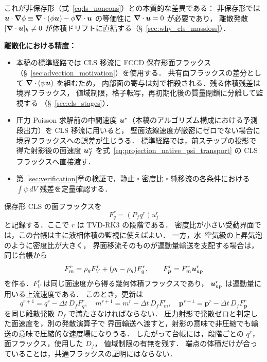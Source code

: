 これが非保存形（式~\eqref{eq:ls_noncons}）との本質的な差異である：
非保存形では $\bm{u}\cdot\bm{\nabla}\phi \equiv \bm{\nabla}\cdot(\phi\bm{u}) - \phi\bm{\nabla}\cdot\bm{u}$
の等価性に $\bm{\nabla}\cdot\bm{u}=0$ が必要であり，
離散発散 $[\bm{\nabla}\cdot\bm{u}]_h\neq 0$ が体積ドリフトに直結する（§~\ref{sec:why_cls_massloss}）．

\textbf{離散化における精度：}
\begin{itemize}
  \item 本稿の標準経路では CLS 移流に FCCD 保存形面フラックス
        （§~\ref{sec:advection_motivation}）を使用する．
        共有面フラックスの差分として $\bm{\nabla}\cdot(\psi\bm{u})$ を組むため，
        内部面の寄与は対で相殺される．残る体積残差は境界フラックス，
        値域制限，格子転写，再初期化後の質量閉鎖に分離して監視する
        （§~\ref{sec:cls_stages}）．
  \item 圧力 Poisson 求解前の中間速度 $\bm{u}^*$（本稿のアルゴリズム構成における予測段出力）を CLS 移流に用いると，
        壁面法線速度が厳密にゼロでない場合に境界フラックスへの誤差が生じうる．
        標準経路では，前ステップの投影で得た射影後の面速度 $\bm{u}_f^n$
        を式~\eqref{eq:projection_native_psi_transport} の CLS フラックスへ直接渡す．
  \item 第~\ref{sec:verification}章の検証で，静止・密度比・純移流の各条件における
        $\int\psi\,dV$ 残差を定量確認する．
\end{itemize}

\begin{tcolorbox}[defbox, title={共通フラックス台帳：界面だけを保存しても足りない場合}]
保存形 CLS の面フラックスを
\[
  F_q^r=(P_f q^r)u_f^r
\]
と記録する．ここで $r$ は TVD-RK3 の段階である．
密度比が小さい受動界面では，この台帳は主に液相体積の監視に使えばよい．
一方，水--空気級の上昇気泡のように密度比が大きく，
界面移流そのものが運動量輸送を支配する場合は，同じ台帳から
\[
  F_m^r=\rho_g F_V^r+(\rho_l-\rho_g)F_q^r,\qquad
  F_{\bm{p}}^r=F_m^r\bm{u}_{\mathrm{up}}^r
\]
を作る．$F_V^r$ は同じ面速度から得る幾何体積フラックスであり，
$\bm{u}_{\mathrm{up}}^r$ は運動量に用いる上流速度である．
このとき，更新は
\[
  q^{r+1}=q^r-\Delta t\,D_fF_q^r,\quad
  m^{r+1}=m^r-\Delta t\,D_fF_m^r,\quad
  \bm{p}^{r+1}=\bm{p}^r-\Delta t\,D_fF_{\bm{p}}^r
\]
を同じ離散発散 $D_f$ で満たさなければならない．
圧力射影で発散ゼロと判定した面速度を，別の発散演算子で
界面輸送へ渡すと，射影の意味で非圧縮でも輸送の意味で圧縮的な速度場になりうる．
したがって台帳には，段階ごとの $q^r$，面フラックス，使用した $D_f$，
値域制限の有無を残す．
端点の体積だけが合っていることは，共通フラックスの証明にはならない．
\end{tcolorbox}

